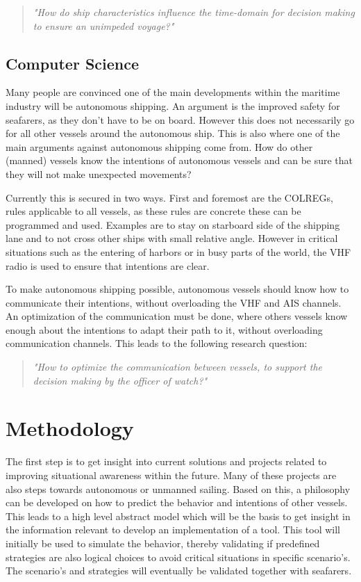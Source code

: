 \begin{quotation}
	\Large
	\emph{"How do ship characteristics influence the time-domain for decision making to ensure an unimpeded voyage?"} 
\end{quotation}

\subsection{Computer Science}
Many people are convinced one of the main developments within the maritime industry will be autonomous shipping. An argument is the improved safety for seafarers, as they don't have to be on board. However this does not necessarily go for all other vessels around the autonomous ship. This is also where one of the main arguments against autonomous shipping come from. How do other (manned) vessels know the intentions of autonomous vessels and can be sure that they will not make unexpected movements?

Currently this is secured in two ways. First and foremost are the COLREGs, rules applicable to all vessels, as these rules are concrete these can be programmed and used. Examples are to stay on starboard side of the shipping lane and to not cross other ships with small relative angle. However in critical situations such as the entering of harbors or in busy parts of the world, the VHF radio is used to ensure that intentions are clear.

To make autonomous shipping possible, autonomous vessels should know how to communicate their intentions, without overloading the VHF and AIS channels. An optimization of the communication must be done, where others vessels know enough about the intentions to adapt their path to it, without overloading communication channels.
This leads to the following research question:

\begin{quotation}
	\Large
	\emph{"How to optimize the communication between vessels, to support the decision making by the officer of watch?"}
\end{quotation}

\section{Methodology}
The first step is to get insight into current solutions and projects related to improving situational awareness within the future. Many of these projects are also steps towards autonomous or unmanned sailing. Based on this, a philosophy can be developed on how to predict the behavior and intentions of other vessels. This leads to a high level abstract model which will be the basis to get insight in the information relevant to develop an implementation of a tool. This tool will initially be used to simulate the behavior, thereby validating if predefined strategies are also logical choices to avoid critical situations in specific scenario's. The scenario's and strategies will eventually be validated together with seafarers.